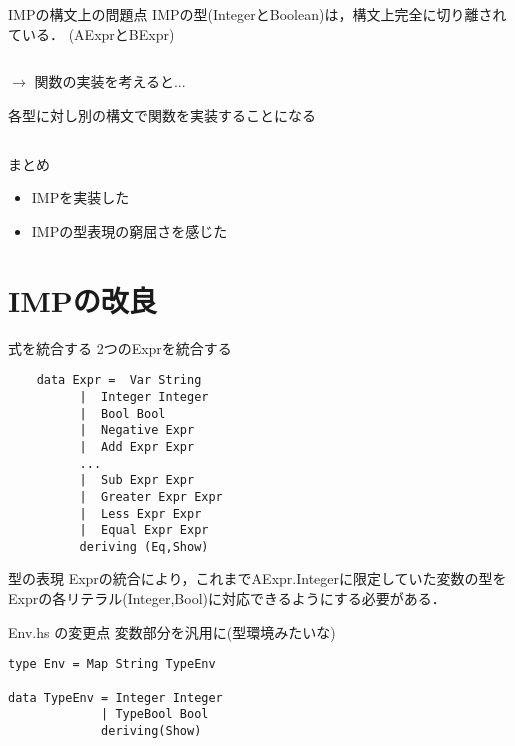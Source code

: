 \documentclass[uplatex,dvipdfmx,ja=standard]{beamer}
\begin{document}
\begin{frame}[fragile]{IMPの構文上の問題点}
    IMPの型(IntegerとBoolean)は，構文上完全に切り離されている．
    (AExprとBExpr)
    \begin{verbatim}
    \end{verbatim}
    $\to$ 関数の実装を考えると...

    各型に対し別の構文で関数を実装することになる
\end{frame}

\subsection{}

\begin{frame}{まとめ}
    \begin{itemize}
        \item \large IMPを実装した
        \item \large IMPの型表現の窮屈さを感じた
    \end{itemize}
\end{frame}

\section{IMPの改良}

\begin{frame}[fragile]{式を統合する}
    2つのExprを統合する
    \begin{verbatim}
    data Expr =  Var String   
          |  Integer Integer 
          |  Bool Bool
          |  Negative Expr
          |  Add Expr Expr
          ...
          |  Sub Expr Expr
          |  Greater Expr Expr
          |  Less Expr Expr
          |  Equal Expr Expr
          deriving (Eq,Show)
    \end{verbatim}

\end{frame}

\begin{frame}[fragile]{型の表現}
    Exprの統合により，これまでAExpr.Integerに限定していた変数の型をExprの各リテラル(Integer,Bool)に対応できるようにする必要がある．

\end{frame}

\begin{frame}[fragile]{Env.hs の変更点}
    変数部分を汎用に(型環境みたいな)
    \begin{verbatim}
type Env = Map String TypeEnv  

data TypeEnv = Integer Integer 
             | TypeBool Bool
             deriving(Show)
    \end{verbatim}
\end{frame}
\end{document}
